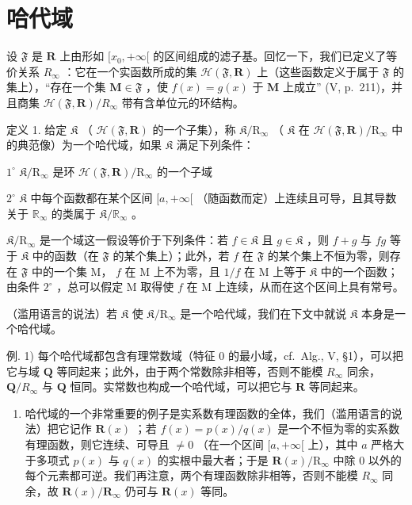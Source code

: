 \section{哈代域}

设 \(\mathfrak{F}\) 是 \(\mathbf{R}\) 上由形如 \([x_0, +\infty[\) 的区间组成的滤子基。回忆一下，我们已定义了等价关系 \(R_{\infty}\) ：它在一个实函数所成的集 \(\mathcal{H}(\mathfrak{F}, \mathbf{R})\) 上（这些函数定义于属于 \(\mathfrak{F}\) 的集上），“存在一个集 \(\mathbf{M} \in \mathfrak{F}\) ，使 \(f(x) = g(x)\) 于 \(\mathbf{M}\) 上成立” (V, p.~211)，并且商集 \(\mathcal{H}(\mathfrak{F}, \mathbf{R}) / R_{\infty}\) 带有含单位元的环结构。

定义 1. 给定 \(\mathfrak{K}\) （ \(\mathcal{H}(\mathfrak{F},\mathbf{R})\) 的一个子集），称 \(\mathfrak{K}/\mathrm{R}_{\infty}\) （ \(\mathfrak{K}\) 在 \(\mathcal{H}(\mathfrak{F},\mathbf{R})/\mathrm{R}_{\infty}\) 中的典范像）为一个哈代域，如果 \(\mathfrak{K}\) 满足下列条件：

\(1^{\circ}\) \(\mathfrak{K} / \mathrm{R}_{\infty}\) 是环 \(\mathcal{H}(\mathfrak{F},\mathbf{R}) / \mathrm{R}_{\infty}\) 的一个子域

\(2^{\circ}\) \(\mathfrak{K}\) 中每个函数都在某个区间 \([a, +\infty[\) （随函数而定）上连续且可导，且其导数关于 \(\mathbb{R}_{\infty}\) 的类属于 \(\mathfrak{K}/\mathbb{R}_{\infty}\) 。

\(\mathfrak{K} / \mathrm{R}_{\infty}\) 是一个域这一假设等价于下列条件：若 \(f\in \mathfrak{K}\) 且 \(g\in \mathfrak{K}\) ，则 \(f + g\) 与 \(fg\) 等于 \(\mathfrak{K}\) 中的函数（在 \(\mathfrak{F}\) 的某个集上）；此外，若 \(f\) 在 \(\mathfrak{F}\) 的某个集上不恒为零，则存在 \(\mathfrak{F}\) 中的一个集 M， \(f\) 在 M 上不为零，且 \(1 / f\) 在 M 上等于 \(\mathfrak{K}\) 中的一个函数；由条件 \(2^{\circ}\) ，总可以假定 M 取得使 \(f\) 在 M 上连续，从而在这个区间上具有常号。

（滥用语言的说法）若 \(\mathfrak{K}\) 使 \(\mathfrak{K} / \mathrm{R}_{\infty}\) 是一个哈代域，我们在下文中就说 \(\mathfrak{K}\) 本身是一个哈代域。

例. 1) 每个哈代域都包含有理常数域（特征 0 的最小域，cf.~Alg., V, §1），可以把它与域 \(\mathbf{Q}\) 等同起来；此外，由于两个常数除非相等，否则不能模 \(R_{\infty}\) 同余， \(\mathbf{Q} / R_{\infty}\) 与 \(\mathbf{Q}\) 恒同。实常数也构成一个哈代域，可以把它与 \(\mathbf{R}\) 等同起来。

\begin{enumerate}
\def\labelenumi{\arabic{enumi})}
\setcounter{enumi}{1}
\tightlist
\item
  哈代域的一个非常重要的例子是实系数有理函数的全体，我们（滥用语言的说法）把它记作 \(\mathbf{R}(x)\) ；若 \(f(x) = p(x)/q(x)\) 是一个不恒为零的实系数有理函数，则它连续、可导且 \(\neq 0\) （在一个区间 \([a, +\infty[\) 上），其中 \(a\) 严格大于多项式 \(p(x)\) 与 \(q(x)\) 的实根中最大者；于是 \(\mathbf{R}(x)/\mathrm{R}_{\infty}\) 中除 0 以外的每个元素都可逆。我们再注意，两个有理函数除非相等，否则不能模 \(R_{\infty}\) 同余，故 \(\mathbf{R}(x)/\mathbf{R}_{\infty}\) 仍可与 \(\mathbf{R}(x)\) 等同。
\end{enumerate}

